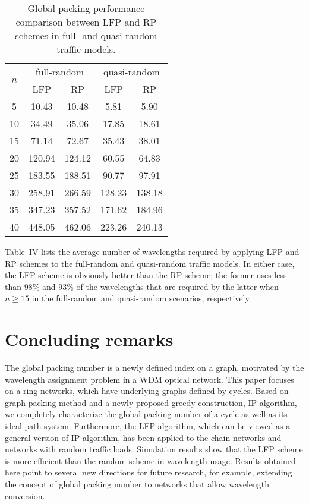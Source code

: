 \documentclass[journal,draftcls,onecolumn,12pt,twoside]{IEEEtran}
\begin{document}
\begin{table}[h]\label{tab:random}
\begin{tabular}{|c||c|c||c|c|}
\hline
\multirow{2}{*}{$n$} &
\multicolumn{2}{c||}{full-random} &
\multicolumn{2}{c|}{quasi-random} \\
\cline{2-5}
  & LFP & RP & LFP & RP \\
\hline \hline
5 & 10.43 & 10.48 & 5.81 & 5.90 \\
\hline
10 & 34.49 & 35.06 & 17.85 & 18.61 \\
\hline
15 & 71.14 & 72.67 & 35.43 & 38.01 \\
\hline
20 & 120.94 & 124.12 & 60.55 & 64.83 \\
\hline
25 & 183.55 & 188.51 & 90.77 & 97.91 \\
\hline
30 & 258.91 & 266.59 & 128.23 & 138.18 \\
\hline
35 & 347.23 & 357.52 & 171.62 & 184.96 \\
\hline
40 & 448.05 & 462.06 & 223.26 & 240.13 \\
\hline
\end{tabular}
\caption{Global packing performance comparison between LFP and RP schemes in full- and quasi-random traffic models.}
\end{table}

Table~IV lists the average number of wavelengths required by applying LFP and RP schemes to the full-random and quasi-random traffic models.
In either case, the LFP scheme is obviously better than the RP scheme; the former uses less than $98\%$ and $93\%$ of the wavelengths that are required by the latter when $n\geq 15$ in the full-random and quasi-random scenarios, respectively.

\medskip



\section{Concluding remarks}\label{sec:conclusion}
The global packing number is a newly defined index on a graph, motivated by
the wavelength assignment problem in a WDM optical network.
This paper focuses on a ring networks, which have underlying graphs defined by cycles.
Based on graph packing method and a newly proposed greedy construction, IP algorithm, we completely characterize the global packing number of a cycle as well as its ideal path system.
Furthermore, the LFP algorithm, which can be viewed as a general version of IP algorithm, has been applied to the chain networks and networks with random traffic loads.
Simulation results show that the LFP scheme is more efficient than the random scheme in wavelength usage.  Results obtained here point to several new directions for future research,
for example, extending the concept of global packing number to networks that allow
wavelength conversion. 
\end{document}
